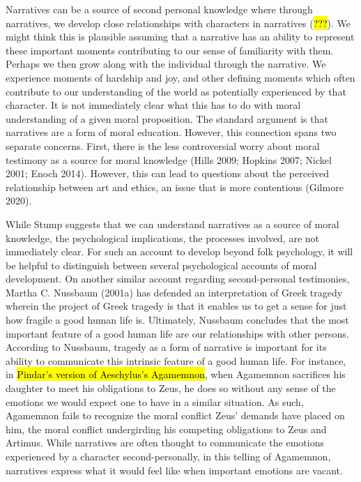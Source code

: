 \documentclass[
  letterpaper,
  DIV=11,
  numbers=noendperiod]{scrartcl}
\theoremstyle{remark}
\begin{document}
Narratives can be a source of second personal knowledge where through
narratives, we develop close relationships with characters in narratives
(\hl{???}). We might think this is plausible assuming that a narrative
has an ability to represent these important moments contributing to our
sense of familiarity with them. Perhaps we then grow along with the
individual through the narrative. We experience moments of hardship and
joy, and other defining moments which often contribute to our
understanding of the world as potentially experienced by that character.
It is not immediately clear what this has to do with moral understanding
of a given moral proposition. The standard argument is that narratives
are a form of moral education. However, this connection spans two
separate concerns. First, there is the less controversial worry about
moral testimony as a source for moral knowledge (Hills 2009; Hopkins
2007; Nickel 2001; Enoch 2014). However, this can lead to questions
about the perceived relationship between art and ethics, an issue that
is more contentious (Gilmore 2020).

While Stump suggests that we can understand narratives as a source of
moral knowledge, the psychological implications, the processes involved,
are not immediately clear. For such an account to develop beyond folk
psychology, it will be helpful to distinguish between several
psychological accounts of moral development. On another similar account
regarding second-personal testimonies, Martha C. Nussbaum (2001a) has
defended an interpretation of Greek tragedy wherein the project of Greek
tragedy is that it enables us to get a sense for just how fragile a good
human life is. Ultimately, Nussbaum concludes that the most important
feature of a good human life are our relationships with other persons.
According to Nussbaum, tragedy as a form of narrative is important for
its ability to communicate this intrinsic feature of a good human life.
For instance, in \hl{Pindar's version of Aeschylus's Agamemnon}, when
Agamemnon sacrifices his daughter to meet his obligations to Zeus, he
does so without any sense of the emotions we would expect one to have in
a similar situation. As such, Agamemnon fails to recognize the moral
conflict Zeus' demands have placed on him, the moral conflict
undergirding his competing obligations to Zeus and Artimus. While
narratives are often thought to communicate the emotions experienced by
a character second-personally, in this telling of Agamemnon, narratives
express what it would feel like when important emotions are vacant.
\end{document}
